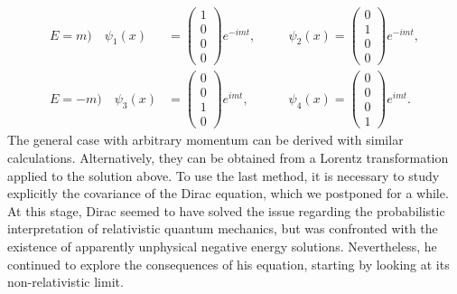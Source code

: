 \[
    \begin{aligned}
        E = m ) \quad \psi_1(x)  & = \begin{pmatrix}
                                         1 \\
                                         0 \\
                                         0 \\
                                         0
                                     \end{pmatrix} e^{-imt}, \quad &  & \psi_2(x) = \begin{pmatrix}
                                                                                        0 \\
                                                                                        1 \\
                                                                                        0 \\
                                                                                        0
                                                                                    \end{pmatrix} e^{-imt}, \\
        E = -m ) \quad \psi_3(x) & = \begin{pmatrix}
                                         0 \\
                                         0 \\
                                         1 \\
                                         0
                                     \end{pmatrix} e^{imt}, \quad  &  & \psi_4(x)  = \begin{pmatrix}
                                                                                         0 \\
                                                                                         0 \\
                                                                                         0 \\
                                                                                         1
                                                                                     \end{pmatrix} e^{imt}.
    \end{aligned}
\]
The general case with arbitrary momentum can be derived with similar calculations. Alternatively, they can be obtained from a Lorentz transformation applied to the solution above. To use the last method, it is necessary to study explicitly the covariance of the Dirac equation, which we postponed for a while. At this stage, Dirac seemed to have solved the issue regarding the probabilistic interpretation of relativistic quantum mechanics, but was confronted with the existence of apparently unphysical negative energy solutions. Nevertheless, he continued to explore the consequences of his equation, starting by looking at its non-relativistic limit.

